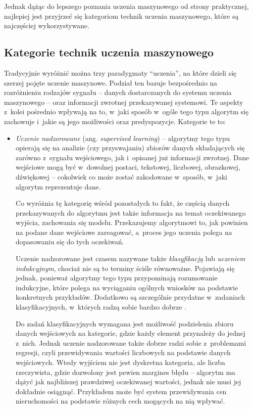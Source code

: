 {Jednak dążąc do lepszego poznania uczenia maszynowego od strony praktycznej, najlepiej jest przyjrzeć się kategoriom technik uczenia maszynowego, które są najczęściej wykorzystywane.

\subsection{Kategorie technik uczenia maszynowego}

Tradycyjnie wyróżnić można trzy paradygmaty ``uczenia'', na które dzieli się szerzej pojęte uczenie maszynowe.
Podział ten bazuje bezpośrednio na rozróżnieniu rodzajów sygnału -- danych dostarczanych do systemu uczenia maszynowego -- oraz informacji zwrotnej przekazywanej systemowi.
Te aspekty z~kolei pośrednio wpływają na to, w~jaki sposób w~ogóle tego typu algorytm się zachowuje i~jakie są jego możliwości oraz predyspozycje.
Kategorie te to:

\begin{itemize}

  \item \emph{Uczenie nadzorowane} (ang. \emph{supervised learning}) --
        algorytmy tego typu opierają się na analizie (czy przyswajaniu) zbiorów danych składających się zarówno z~sygnału wejściowego, jak i~opisanej już informacji zwrotnej.
        Dane wejściowe mogą być w~dowolnej postaci, tekstowej, liczbowej, obrazkowej, dźwiękowej -- cokolwiek co może zostać zakodowane w~sposób, w~jaki algorytm reprezentuje dane.

        Co wyróżnia tę kategorię wśród pozostałych to fakt, że częścią danych przekazywanych do algorytmu jest także informacja na temat oczekiwanego wyjścia, zachowania się modelu.
        Przekazujemy algorytmowi to, jak powinien na podane dane wejściowe zareagować, a~proces jego uczenia polega na dopasowaniu się do tych oczekiwań.

        Uczenie nadzorowane jest czasem nazywane także \emph{klasyfikacją} lub \emph{uczeniem indukcyjnym}, chociaż nie są to terminy ściśle równoważne.
        Pojawiają się jednak, ponieważ algorytmy tego typu przypominają rozumowanie indukcyjne, które polega na wyciąganiu ogólnych wniosków na podstawie konkretnych przykładów.
        Dodatkowo są szczególnie przydatne w~zadaniach klasyfikacyjnych, w~których radzą sobie bardzo dobrze \cite{hastie2009overview}.

        Do zadań klasyfikacyjnych wymagana jest możliwość podzielenia zbioru danych wejściowych na kategorie, gdzie każdy element przynależy do jednej z~nich.
        Jednak uczenie nadzorowane także dobrze radzi sobie z~problemami regresji, czyli przewidywania wartości liczbowych na podstawie danych wejściowych.
        Wtedy wyjściem nie jest dyskretna kategoria, ale liczba rzeczywista, gdzie dozwolony jest pewien margines błędu -- algorytm ma dążyć jak najbliższej prawdziwej oczekiwanej wartości, jednak nie musi jej dokładnie osiągnąć.
        Przykładem może być system przewidywania cen nieruchomości na podstawie różnych cech mogących na nią wpływać.


\end{itemize}}

